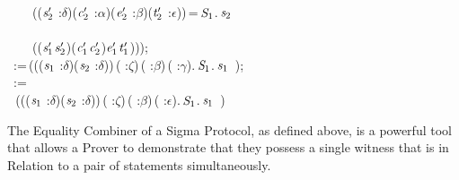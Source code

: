 \begin{holmath}
\,\,\,\,\,\,\,\,\,\,\,\,((\ensuremath{\HOLBoundVar{s}\sb{\mathrm{2}}\sp{\prime{}}} :\ensuremath{\delta})\HOLSymConst{,}(\ensuremath{\HOLBoundVar{c}\sb{\mathrm{2}}\sp{\prime{}}} :\ensuremath{\alpha})\HOLSymConst{,}(\ensuremath{\HOLBoundVar{e}\sb{\mathrm{2}}\sp{\prime{}}} :\ensuremath{\beta})\HOLSymConst{,}(\ensuremath{\HOLBoundVar{t}\sb{\mathrm{2}}\sp{\prime{}}} :\ensuremath{\epsilon}))\,=\,\ensuremath{\HOLFreeVar{S}\sb{\mathrm{1}}}.\,\ensuremath{\HOLBoundVar{s}\sb{\mathrm{2}}}\,\,\\
\,\,\,\,\,\,\,\,\,\,\\
\,\,\,\,\,\,\,\,\,\,\,\,((\ensuremath{\HOLBoundVar{s}\sb{\mathrm{1}}\sp{\prime{}}}\HOLSymConst{,}\ensuremath{\HOLBoundVar{s}\sb{\mathrm{2}}\sp{\prime{}}})\HOLSymConst{,}(\ensuremath{\HOLBoundVar{c}\sb{\mathrm{1}}\sp{\prime{}}}\HOLSymConst{,}\ensuremath{\HOLBoundVar{c}\sb{\mathrm{2}}\sp{\prime{}}})\HOLSymConst{,}\ensuremath{\HOLBoundVar{e}\sb{\mathrm{1}}\sp{\prime{}}}\HOLSymConst{,}\ensuremath{\HOLBoundVar{t}\sb{\mathrm{1}}\sp{\prime{}}})));\\
\,\,\,:=\,(\HOLTokenLambda{}((\ensuremath{\HOLBoundVar{s}\sb{\mathrm{1}}} :\ensuremath{\delta})\HOLSymConst{,}(\ensuremath{\HOLBoundVar{s}\sb{\mathrm{2}}} :\ensuremath{\delta}))\,( :\ensuremath{\zeta})\,( :\ensuremath{\beta})\,( :\ensuremath{\gamma}).\,\ensuremath{\HOLFreeVar{S}\sb{\mathrm{1}}}.\,\ensuremath{\HOLBoundVar{s}\sb{\mathrm{1}}}\,\,\,);\\
\,\,\,:=\\
\,\,\,\,(\HOLTokenLambda{}((\ensuremath{\HOLBoundVar{s}\sb{\mathrm{1}}} :\ensuremath{\delta})\HOLSymConst{,}(\ensuremath{\HOLBoundVar{s}\sb{\mathrm{2}}} :\ensuremath{\delta}))\,( :\ensuremath{\zeta})\,( :\ensuremath{\beta})\,( :\ensuremath{\epsilon}).\,\ensuremath{\HOLFreeVar{S}\sb{\mathrm{1}}}.\,\ensuremath{\HOLBoundVar{s}\sb{\mathrm{1}}}\,\,\,)\HOLTokenRightrec{}
\end{holmath}   

The Equality Combiner of a Sigma Protocol, as defined above, is a powerful tool that allows a Prover to demonstrate that they possess a single witness that is in Relation to a pair of statements simultaneously.

